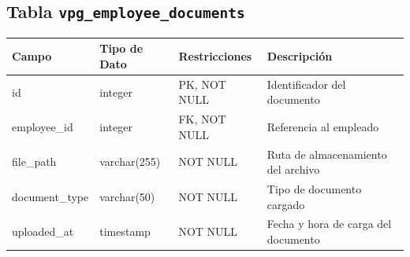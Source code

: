 \begin{center}
	\subsection{Tabla \texttt{vpg\_employee\_documents}}
	\small
	\begin{tabular}{|l|l|l|p{6cm}|}
		\hline
		\textbf{Campo} & \textbf{Tipo de Dato} & \textbf{Restricciones} & \textbf{Descripción}                \\
		\hline
		id             & integer               & PK, NOT NULL           & Identificador del documento         \\
		employee\_id   & integer               & FK, NOT NULL           & Referencia al empleado              \\
		file\_path     & varchar(255)          & NOT NULL               & Ruta de almacenamiento del archivo  \\
		document\_type & varchar(50)           & NOT NULL               & Tipo de documento cargado           \\
		uploaded\_at   & timestamp             & NOT NULL               & Fecha y hora de carga del documento \\
		\hline
	\end{tabular}
	\normalsize

\end{center}
